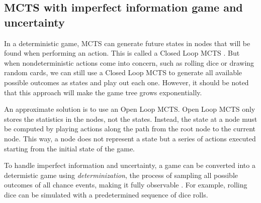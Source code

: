 
\subsection{MCTS with imperfect information game and uncertainty}

In a deterministic game, MCTS can generate future states in nodes that will be found when performing an action. This is called a Closed Loop MCTS \cite{Perez_Liebana_2015}. But when nondeterministic actions come into concern, such as rolling dice or drawing random cards, we can still use a Closed Loop MCTS to generate all available possible outcomes as states and play out each one. However, it should be noted that this approach will make the game tree grows exponentially. 

An approximate solution is to use an Open Loop MCTS. Open Loop MCTS only stores the statistics in the nodes, not the states. Instead, the state at a node must be computed by playing actions along the path from the root node to the current node. This way, a node does not represent a state but a series of actions executed starting from the initial state of the game.

To handle imperfect information and uncertainty, a game can be converted into a determistic game using \textit{determinization}, the process of sampling all possible outcomes of all chance events, making it fully observable \cite{mcts-survey}. For example, rolling dice can be simulated with a predetermined sequence of dice rolls.



